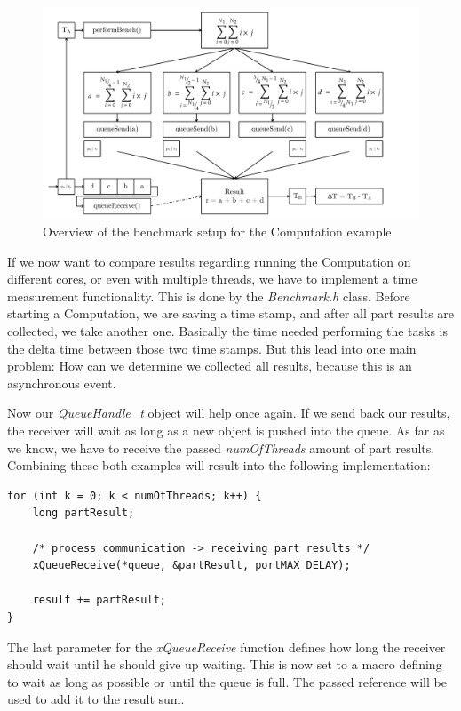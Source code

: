 \begin{figure}[htbp]
	\centerline{\includegraphics[width=1.1\linewidth]{images/Split-Sum-Message-Passing.pdf}}
	\caption{ Overview of the benchmark setup for the Computation example }
	\label{fig:splitSumOverview}
\end{figure}

\noindent If we now want to compare results regarding running the Computation on different cores, or even with multiple threads, we have to implement a time measurement functionality. This is done by the \textit{Benchmark.h} class. Before starting a Computation, we are saving a time stamp, and after all part results are collected, we take another one. Basically the time needed performing the tasks is the delta time between those two time stamps. But this lead into one main problem: How can we determine we collected all results, because this is an asynchronous event. 

Now our \textit{QueueHandle\_t} object will help once again. If we send back our results, the receiver will wait as long as a new object is pushed into the queue. As far as we know, we have to receive the passed \textit{numOfThreads} amount of part results. Combining these both examples will result into the following implementation:

\begin{lstlisting}[label={code:queueReceive}]
for (int k = 0; k < numOfThreads; k++) {
	long partResult;
	
	/* process communication -> receiving part results */
	xQueueReceive(*queue, &partResult, portMAX_DELAY);
	
	result += partResult;
}
\end{lstlisting}  

The last parameter for the \textit{xQueueReceive} function defines how long the receiver should wait until he should give up waiting. This is now set to a macro defining to wait as long as possible or until the queue is full. The passed reference will be used to add it to the result sum.

